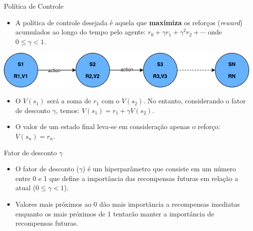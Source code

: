 \documentclass{beamer}
\begin{document}
\begin{frame}{Política de Controle}
	\begin{itemize}
	\item A política de controle desejada é aquela que \textbf{maximiza} os reforços 
	(\textit{reward}) acumulados ao longo do tempo pelo 
	agente: $r_{0} + \gamma r_{1} + \gamma^{2} r_{2} + \cdots $ onde $0 \leq \gamma < 1$.
	\end{itemize}


  \begin{center}
	\includegraphics[width=.7\textwidth]{figuras/sequencia.png}
\end{center}

\begin{itemize}
	\item O $V(s_{1})$ será a soma de $r_{1}$ com o $V(s_{2})$. No entanto, considerando 
	o fator de desconto $\gamma$, temos: $V(s_{1}) = r_{1} + \gamma V(s_{2}) $.
	
	\item O valor de um estado final leva-se em consideração apenas o 
	reforço: $V(s_{n}) = r_{n}$.
	
\end{itemize}
\end{frame}

\begin{frame}{Fator de desconto $\gamma$}
	\small
	\begin{itemize}
		\item O fator de desconto ($\gamma$) é um hiperparâmetro que consiste 
		em um número entre 0 e 1 que define a importância das recompensas futuras 
		em relação a atual	($0 \leq \gamma < 1$).
		\item Valores mais próximos ao 0 dão mais importância a recompensas 
		imediatas enquanto os mais próximos de 1 tentarão manter a importância 
		de recompensas futuras.
	\end{itemize}
\end{frame}
\end{document}
